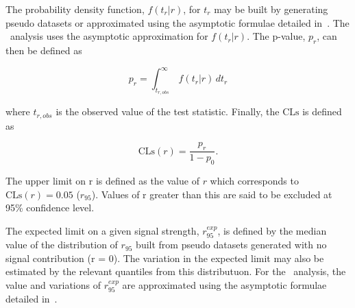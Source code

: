 The probability density function, $f(t_r|r)$, for $t_r$ may be built by 
generating pseudo datasets or approximated using the asymptotic formulae 
detailed in~\cite{asymp}. The \alphat~analysis uses the asymptotic
approximation for $f(t_r|r)$. The p-value, $p_r$, can then be defined as

\begin{equation}
p_r = \int_{t_{r,obs}}^{\infty}\, f(t_r|r)\, dt_r
\end{equation}

where ${t_{r,obs}}$ is the observed value of the test statistic. Finally,
the $\text{CLs}$ is defined as

\begin{equation}
\text{CLs}(r) = \frac{p_r}{1-p_0}.
\end{equation}

The upper limit on r is defined as the value of $r$ which corresponds to 
$\text{CLs}(r) = 0.05$ ($r_{95}$). Values of r greater than this are said to be excluded at 95\%
confidence level.

The expected limit on a given signal strength, $r_{95}^{exp}$, is defined by the median value of the distribution
of $r_{95}$ built from pseudo datasets generated with no signal contribution (r = 0). The variation in the 
expected limit may also be estimated by the relevant quantiles from this distributuon.
For the \alphat~analysis, the value and variations of $r_{95}^{exp}$ are approximated using 
the asymptotic formulae detailed in~\cite{asymp}.
